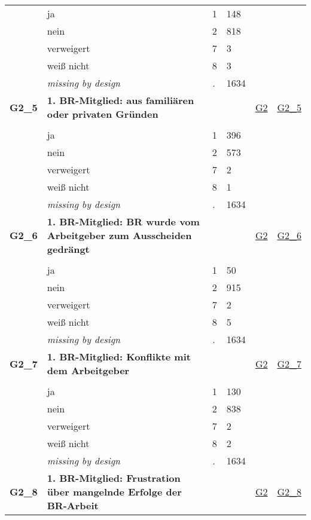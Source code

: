 \begin{longtable}{| L{2.45cm} | L{6cm} | C{1.5cm} | R{1cm} | C{2.25cm} | C{2.25cm} |}
   & ja & 1 & 148 &  &  \\ 
   & nein & 2 & 818 &  &  \\ 
   & verweigert & 7 & 3 &  &  \\ 
   & weiß nicht & 8 & 3 &  &  \\ 
   & \textit{missing by design} & \textit{.} & 1634 &  &  \\ 
   \midrule
\textbf{G2\_5}\label{var:G2:5} & \textbf{1. BR-Mitglied: aus familiären oder privaten Gründen} &  &  & \hyperref[G2]{G2} & \hyperref[var:suf:G2:5]{G2\_5} \\ 
   &  &  &  &  &  \\ 
   & ja & 1 & 396 &  &  \\ 
   & nein & 2 & 573 &  &  \\ 
   & verweigert & 7 & 2 &  &  \\ 
   & weiß nicht & 8 & 1 &  &  \\ 
   & \textit{missing by design} & \textit{.} & 1634 &  &  \\ 
   \midrule
\textbf{G2\_6}\label{var:G2:6} & \textbf{1. BR-Mitglied: BR wurde vom Arbeitgeber zum Ausscheiden gedrängt} &  &  & \hyperref[G2]{G2} & \hyperref[var:suf:G2:6]{G2\_6} \\ 
   &  &  &  &  &  \\ 
   & ja & 1 & 50 &  &  \\ 
   & nein & 2 & 915 &  &  \\ 
   & verweigert & 7 & 2 &  &  \\ 
   & weiß nicht & 8 & 5 &  &  \\ 
   & \textit{missing by design} & \textit{.} & 1634 &  &  \\ 
   \midrule
\textbf{G2\_7}\label{var:G2:7} & \textbf{1. BR-Mitglied: Konflikte mit dem Arbeitgeber} &  &  & \hyperref[G2]{G2} & \hyperref[var:suf:G2:7]{G2\_7} \\ 
   &  &  &  &  &  \\ 
   & ja & 1 & 130 &  &  \\ 
   & nein & 2 & 838 &  &  \\ 
   & verweigert & 7 & 2 &  &  \\ 
   & weiß nicht & 8 & 2 &  &  \\ 
   & \textit{missing by design} & \textit{.} & 1634 &  &  \\ 
   \midrule
\textbf{G2\_8}\label{var:G2:8} & \textbf{1. BR-Mitglied: Frustration über mangelnde Erfolge der BR-Arbeit} &  &  & \hyperref[G2]{G2} & \hyperref[var:suf:G2:8]{G2\_8} \\ 

\end{longtable}
